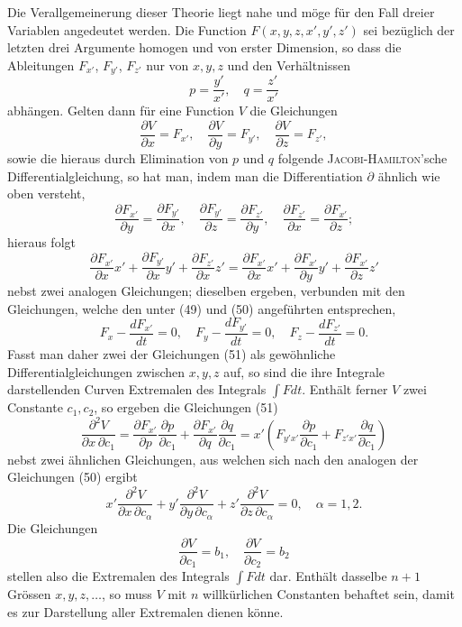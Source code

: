 \documentclass[11pt,a4paper,leqno]{article}
\begin{document}
Die Verallgemeinerung dieser Theorie liegt nahe und möge für den Fall dreier Variablen angedeutet werden. Die Function $F(x,y,z,x',y',z')$ sei bezüglich der letzten drei Argumente homogen und von erster Dimension, so dass die Ableitungen $F_{x'}$, $F_{y'}$, $F_{z'}$ nur von $x,y,z$ und den Verhältnissen
\[
p=\frac{y'}{x'},\quad q=\frac{z'}{x'}
\]
abhängen. Gelten dann für eine Function $V$ die Gleichungen
\begin{equation}\tag{51}
\frac{\partial V}{\partial x}=F_{x'},\quad
\frac{\partial V}{\partial y}=F_{y'},\quad
\frac{\partial V}{\partial z}=F_{z'},
\end{equation}
sowie die hieraus durch Elimination von $p$ und $q$ folgende \textsc{Jacobi-Hamilton}'sche Differentialgleichung, so hat man, indem man die Differentiation $\partial$ ähnlich wie oben versteht,
\[
\frac{\partial F_{x'}}{\partial y}=\frac{\partial F_{y'}}{\partial x},\quad
\frac{\partial F_{y'}}{\partial z}=\frac{\partial F_{z'}}{\partial y},\quad
\frac{\partial F_{z'}}{\partial x}=\frac{\partial F_{x'}}{\partial z};
\]
hieraus folgt
\[
\frac{\partial F_{x'}}{\partial x}x'
+\frac{\partial F_{y'}}{\partial x}y'
+\frac{\partial F_{z'}}{\partial x}z'
=
\frac{\partial F_{x'}}{\partial x}x'
+\frac{\partial F_{x'}}{\partial y}y'
+\frac{\partial F_{x'}}{\partial z}z'
\]
nebst zwei analogen Gleichungen; dieselben ergeben, verbunden mit den Gleichungen, welche den unter (49) und (50) angeführten entsprechen,
\[
F_x-\frac{dF_{x'}}{dt}=0,\quad
F_y-\frac{dF_{y'}}{dt}=0,\quad
F_z-\frac{dF_{z'}}{dt}=0.
\]
Fasst man daher zwei der Gleichungen (51) als gewöhnliche Differentialgleichungen zwischen $x,y,z$ auf, so sind die ihre Integrale darstellenden Curven Extremalen des Integrals $\int Fdt$. Enthält ferner $V$ zwei Constante $c_1,c_2$, so ergeben die Gleichungen (51)
\[
\frac{\partial^2V}{\partial x\,\partial c_1}
=
\frac{\partial F_{x'}}{\partial p}\frac{\partial p}{\partial c_1}
+
\frac{\partial F_{x'}}{\partial q}\frac{\partial q}{\partial c_1}
=
x'\left(
F_{y'x'}\frac{\partial p}{\partial c_1}
+
F_{z'x'}\frac{\partial q}{\partial c_1}
\right)
\]
nebst zwei ähnlichen Gleichungen, aus welchen sich nach den analogen der Gleichungen (50) ergibt
\[
x'\frac{\partial^2V}{\partial x\,\partial c_\alpha}
+
y'\frac{\partial^2V}{\partial y\,\partial c_\alpha}
+
z'\frac{\partial^2V}{\partial z\,\partial c_\alpha}
=0,\quad \alpha=1,2.
\]
Die Gleichungen
\[
\frac{\partial V}{\partial c_1}=b_1,\quad
\frac{\partial V}{\partial c_2}=b_2
\]
stellen also die Extremalen des Integrals $\int Fdt$ dar. Enthält dasselbe $n+1$ Grössen $x,y,z,\ldots$, so muss $V$ mit $n$ willkürlichen Constanten behaftet sein, damit es zur Darstellung aller Extremalen dienen könne.
\end{document}

